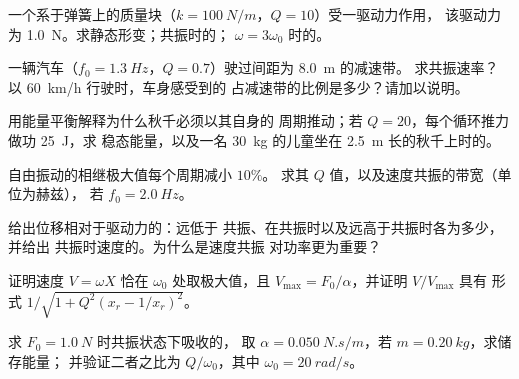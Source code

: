 \begin{exercise}[$\star$]\label{exo:b1:oscillators-resonance:4}
一个系于弹簧上的质量块（$k = \qty{100}{N/m}$，$Q = 10$）受一驱动力作用，
该驱动力为 \qty{1.0}{N}。求静态形变；共振时的；
$\omega = 3\omega_0$ 时的。
\end{exercise}

\begin{exercise}[$\star\star$]\label{exo:b1:oscillators-resonance:5}
一辆汽车（$f_0 = \qty{1.3}{Hz}$，$Q = 0.7$）驶过间距为 \qty{8.0}{m} 的减速带。
求共振速率？以 \qty{60}{km/h} 行驶时，车身感受到的
占减速带的比例是多少？请加以说明。
\end{exercise}

\begin{exercise}[$\star\star$]\label{exo:b1:oscillators-resonance:6}
用能量平衡解释为什么秋千必须以其自身的
周期推动；若 $Q = 20$，每个循环推力做功 \qty{25}{J}，求
稳态能量，以及一名 \qty{30}{kg} 的儿童坐在
\qty{2.5}{m} 长的秋千上时的。
\end{exercise}

\begin{exercise}[$\star\star$]\label{exo:b1:oscillators-resonance:7}
自由振动的相继极大值每个周期减小 $10\%$。
求其 $Q$ 值，以及速度共振的带宽（单位为赫兹），
若 $f_0 = \qty{2.0}{Hz}$。
\end{exercise}

\begin{exercise}[$\star\star$]\label{exo:b1:oscillators-resonance:8}
给出位移相对于驱动力的：远低于
共振、在共振时以及远高于共振时各为多少，并给出
共振时速度的。为什么是速度共振
对功率更为重要？
\end{exercise}

\begin{exercise}[$\star\star$]\label{exo:b1:oscillators-resonance:9}
证明速度 $V = \omega X$ 恰在
$\omega_0$ 处取极大值，且 $V_{\max} = F_0/\alpha$，并证明 $V/V_{\max}$ 具有
形式 $1/\sqrt{1 + Q^2(x_r - 1/x_r)^2}$。
\end{exercise}

\begin{exercise}[$\star\star\star$]\label{exo:b1:oscillators-resonance:10}
求 $F_0 = \qty{1.0}{N}$ 时共振状态下吸收的，
取 $\alpha = \qty{0.050}{N.s/m}$，若 $m = \qty{0.20}{kg}$，求储存能量；
并验证二者之比为 $Q/\omega_0$，其中 $\omega_0 = \qty{20}{rad/s}$。
\end{exercise}

